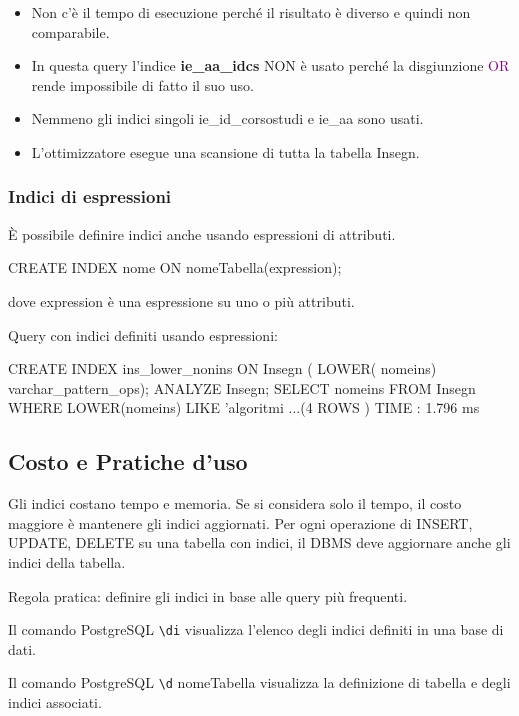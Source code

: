 \begin{itemize}
  \item Non c’è il tempo di esecuzione perché il risultato è diverso e quindi non comparabile.
  \item In questa query l’indice \textbf{ie\_aa\_idcs} NON è usato perché la disgiunzione \textcolor{purple}{OR} rende impossibile di fatto il suo uso.
  \item Nemmeno gli indici singoli ie\_id\_corsostudi e ie\_aa sono usati.
  \item L’ottimizzatore esegue una scansione di tutta la tabella Insegn.
\end{itemize}


\subsubsection{Indici di espressioni}
È possibile definire indici anche usando espressioni di attributi.
\begin{codiceSQL}
  CREATE INDEX nome ON nomeTabella(expression);
\end{codiceSQL}
dove expression è una espressione su uno o più attributi.


Query con indici definiti usando espressioni:
\begin{codiceSQL}
CREATE INDEX ins_lower_nonins ON Insegn
( LOWER( nomeins) varchar_pattern_ops);
ANALYZE Insegn;
SELECT nomeins FROM Insegn
WHERE LOWER(nomeins) LIKE 'algoritmi %
...(4 ROWS )
TIME : 1.796 ms
  
\end{codiceSQL}

\subsection{Costo e Pratiche d'uso}
Gli indici costano tempo e memoria.
Se si considera solo il tempo, il costo maggiore è mantenere gli indici aggiornati.
Per ogni operazione di INSERT, UPDATE, DELETE su una tabella con indici, il DBMS deve aggiornare anche gli indici della tabella.

\textcolor{black!60!red}{Regola pratica: definire gli indici in base alle query più frequenti.}

Il comando PostgreSQL \texttt{\textbackslash di} visualizza l’elenco degli indici definiti in una base di dati.

Il comando PostgreSQL \texttt{\textbackslash d} nomeTabella visualizza la definizione di tabella e degli indici associati.


